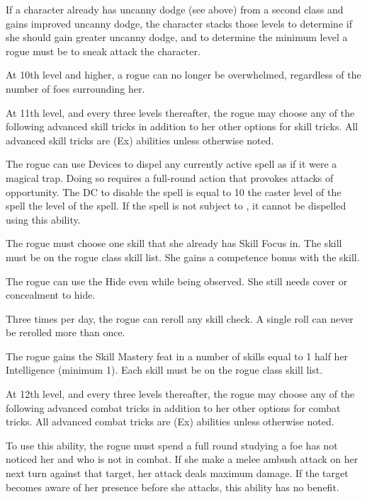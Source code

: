 \par If a character already has uncanny dodge (see above) from a second class and gains improved uncanny dodge, the character stacks those levels to determine if she should gain greater uncanny dodge, and to determine the minimum level a rogue must be to sneak attack the character.

 At 10th level and higher, a rogue can no longer be overwhelmed, regardless of the number of foes surrounding her.

 At 11th level, and every three levels thereafter, the rogue may choose any of the following advanced skill tricks in addition to her other options for skill tricks. All advanced skill tricks are (Ex) abilities unless otherwise noted.

 The rogue can use Devices to dispel any currently active spell as if it were a magical trap. Doing so requires a full-round action that provokes attacks of opportunity. The DC to disable the spell is equal to 10 \add the caster level of the spell \add the level of the spell. If the spell is not subject to , it cannot be dispelled using this ability.

 The rogue must choose one skill that she already has Skill Focus in. The skill must be on the rogue class skill list. She gains a  competence bonus with the skill.

 The rogue can use the Hide even while being observed. She still needs cover or concealment to hide.

 Three times per day, the rogue can reroll any skill check. A single roll can never be rerolled more than once.

 The rogue gains the Skill Mastery feat in a number of skills equal to 1 \add half her Intelligence (minimum 1). Each skill must be on the rogue class skill list.

 At 12th level, and every three levels thereafter, the rogue may choose any of the following advanced combat tricks in addition to her other options for combat tricks. All advanced combat tricks are (Ex) abilities unless otherwise noted.

 To use this ability, the rogue must spend a full round studying a foe has not noticed her and who is not in combat. If she make a melee ambush attack on her next turn against that target, her attack deals maximum damage. If the target becomes aware of her presence before she attacks, this ability has no benefit.

